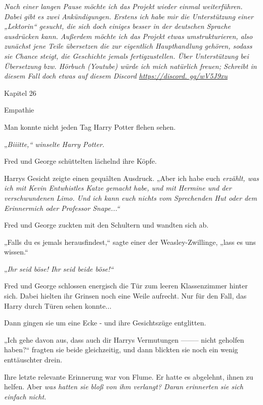 

\hypertarget{empathie}{%

\emph{Nach einer langen Pause möchte ich das Projekt wieder einmal weiterführen. Dabei gibt es zwei Ankündigungen. Erstens ich habe mir die Unterstützung einer „Lektorin“ gesucht, die sich doch einiges besser in der deutschen Sprache ausdrücken kann. Außerdem möchte ich das Projekt etwas umstrukturieren, also zunächst jene Teile übersetzen die zur eigentlich Haupthandlung gehören, sodass sie Chance steigt, die Geschichte jemals fertigzustellen. Über Unterstützung bei Übersetzung bzw. Hörbuch (Youtube) würde ich mich natürlich freuen; Schreibt in diesem Fall doch etwas auf diesem Discord \href{https://discord.\%20gg/wV5J9xu“\%20target=}{https://discord. gg/wV5J9xu} ~}

Kapitel 26

Empathie

Man konnte nicht jeden Tag Harry Potter flehen sehen.

„\emph{Biiitte,“ winselte Harry Potter.}

Fred und George schüttelten lächelnd ihre Köpfe.

Harrys Gesicht zeigte einen gequälten Ausdruck. „Aber ich habe euch \emph{erzählt, was ich mit Kevin Entwhistles Katze gemacht habe, und mit Hermine und der verschwundenen Limo. Und ich \emph{kann} euch \emph{nichts} vom Sprechenden Hut oder dem Erinnermich oder Professor Snape...“}

Fred und George zuckten mit den Schultern und wandten sich ab.

„Falls du es jemals herausfindest,“ sagte einer der Weasley-Zwillinge, „lass es uns wissen.“

„\emph{Ihr seid böse! Ihr seid beide böse!“}

Fred und George schlossen energisch die Tür zum leeren Klassenzimmer hinter sich. Dabei hielten ihr Grinsen noch eine Weile aufrecht. Nur für den Fall, das Harry durch Türen sehen konnte...

Dann gingen sie um eine Ecke - und ihre Gesichtszüge entglitten.

„Ich gehe davon aus, dass auch dir Harrys Vermutungen -------- nicht geholfen haben?“ fragten sie beide gleichzeitig, und dann blickten sie noch ein wenig enttäuschter drein.

Ihre letzte relevante Erinnerung war von Flume. Er hatte es abgelehnt, ihnen zu helfen. Aber \emph{was hatten sie bloß von ihm verlangt? Daran erinnerten sie sich einfach nicht.}

}
